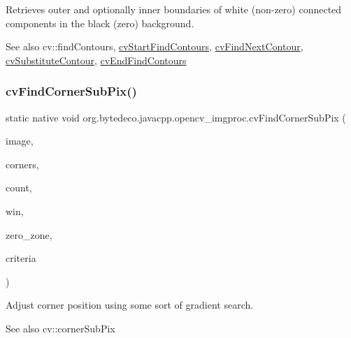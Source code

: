 Retrieves outer and optionally inner boundaries of white (non-\/zero) connected components in the black (zero) background. 

\begin{DoxySeeAlso}{See also}
cv\+::find\+Contours, \hyperlink{group__imgproc__c_ga17ceae2468b1b23ece917fb982a377ff}{cv\+Start\+Find\+Contours}, \hyperlink{group__imgproc__c_gab3ea632f49f741ef73888cd1ab8f9556}{cv\+Find\+Next\+Contour}, \hyperlink{group__imgproc__c_ga9d72a578b9f29589e8b85b100cd25e01}{cv\+Substitute\+Contour}, \hyperlink{group__imgproc__c_ga79913a8abbec2491176f92da28a62346}{cv\+End\+Find\+Contours} 
\end{DoxySeeAlso}
\mbox{\label{group__imgproc__c_ga8d2fc90c5a9c87db2df8e7253e320142}} 
\subsubsection{\texorpdfstring{cv\+Find\+Corner\+Sub\+Pix()}{cvFindCornerSubPix()}}
{\footnotesize\ttfamily static native void org.\+bytedeco.\+javacpp.\+opencv\+\_\+imgproc.\+cv\+Find\+Corner\+Sub\+Pix (\begin{DoxyParamCaption}\item[{@Const Cv\+Arr}]{image,  }\item[{Cv\+Point2\+D32f}]{corners,  }\item[{int}]{count,  }\item[{@By\+Val Cv\+Size}]{win,  }\item[{@By\+Val Cv\+Size}]{zero\+\_\+zone,  }\item[{@By\+Val Cv\+Term\+Criteria}]{criteria }\end{DoxyParamCaption})\hspace{0.3cm}{\ttfamily [static]}}



Adjust corner position using some sort of gradient search. 

\begin{DoxySeeAlso}{See also}
cv\+::corner\+Sub\+Pix 
\end{DoxySeeAlso}
\mbox{\label{group__imgproc__c_gab3ea632f49f741ef73888cd1ab8f9556}} 
